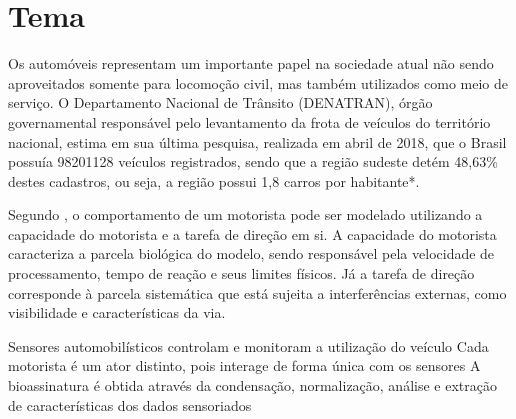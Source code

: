 \documentclass[
	12pt,				%
	oneside,			%
	a4paper,			%
	english,			%
	brazil				%
	]{abntex2ppgsi}
\begin{document}



\textual



% 
%
%
\chapter{Tema}
Os automóveis representam um importante papel na sociedade atual não
sendo aproveitados somente para locomoção civil, mas também utilizados
como meio de serviço. O Departamento Nacional de Trânsito
(DENATRAN), órgão governamental responsável pelo levantamento da frota de
veículos do território nacional, estima em sua última pesquisa, realizada
em abril de 2018, que o Brasil possuía \num{98201128} veículos
registrados, sendo que a região sudeste detém 48,63\% destes
cadastros, ou seja, a região possui 1,8 carros por habitante*.




Segundo \cite{Fuller2005461}, o comportamento de um motorista pode ser
modelado utilizando a capacidade do motorista e a tarefa de direção em
si. A capacidade do motorista caracteriza a parcela biológica do
modelo, sendo responsável pela velocidade de processamento, tempo de
reação e seus limites físicos. Já a tarefa de direção corresponde à parcela
sistemática que está sujeita a interferências externas,
como visibilidade e características da via.

Sensores automobilísticos controlam e monitoram a utilização do veículo
Cada motorista é um ator distinto, pois interage de forma única com os sensores
A bioassinatura é obtida através da condensação, normalização, análise e extração de características dos dados sensoriados
\end{document}
